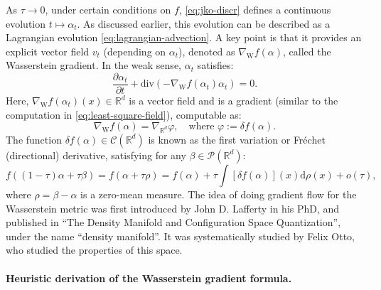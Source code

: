 As $\tau \to 0$, under certain conditions on $f$, \eqref{eq:jko-discr} defines a continuous evolution $t \mapsto \alpha_t$. As discussed earlier, this evolution can be described as a Lagrangian evolution \eqref{eq:lagrangian-advection}. A key point is that it provides an explicit vector field $v_t$ (depending on $\alpha_t$), denoted as $\nabla_{\mathrm{W}} f(\alpha)$, called the Wasserstein gradient. In the weak sense, $\alpha_t$ satisfies:
\begin{equation}
    \frac{\partial \alpha_t}{\partial t} + \mathrm{div}(-\nabla_{\mathrm{W}} f(\alpha_t) \alpha_t) = 0. \label{eq:wassflow-pde}
\end{equation}
Here, $\nabla_{\mathrm{W}} f(\alpha_t)(x) \in \mathbb{R}^d$ is a vector field and is a gradient (similar to the computation in \eqref{eq:least-square-field}), computable as:
\begin{equation*}
    \nabla_{\mathrm{W}} f(\alpha) = \nabla_{\mathbb{R}^d} \varphi, \quad \text{where } \varphi := \delta f(\alpha).
\end{equation*}
The function $\delta f(\alpha) \in \mathcal{C}(\mathbb{R}^d)$ is known as the first variation or Fr\'echet (directional) derivative, satisfying for any $\beta \in \mathcal{P}(\mathbb{R}^d)$:
\begin{equation*}
    f((1-\tau)\alpha + \tau \beta) = f(\alpha + \tau \rho) = f(\alpha) + \tau \int [\delta f(\alpha)](x) \mathrm{d} \rho(x) + o(\tau),
\end{equation*}
where $\rho = \beta - \alpha$ is a zero-mean measure.
%
The idea of doing gradient flow for the Wasserstein metric was first introduced by John D. Lafferty in his PhD, and published in ``The Density Manifold and Configuration Space Quantization'', under the name ``density manifold''. It was systematically studied by Felix Otto, who studied the properties of this space.

\paragraph{Heuristic derivation of the Wasserstein gradient formula.}

